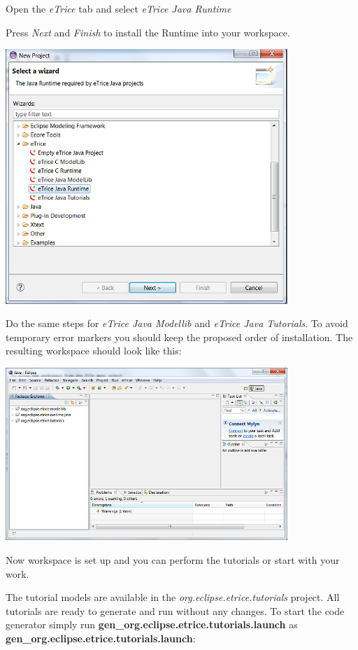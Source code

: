 Open the \textit{eTrice} tab and select \textit{eTrice Java Runtime}

Press \textit{Next} and \textit{Finish} to install the Runtime into your workspace.

\includegraphics[width=0.8\textwidth]{images/013-SetupWorkspace03.png}

Do the same steps for \textit{eTrice Java Modellib} and \textit{eTrice Java Tutorials}. To avoid temporary 
error markers you should keep the proposed order of installation. The resulting workspace should look like 
this:

\includegraphics[width=0.8\textwidth]{images/013-SetupWorkspace04.png}

Now workspace is set up and you can perform the tutorials or start with your work.

The tutorial models are available in the \textit{org.eclipse.etrice.tutorials} project. All tutorials are 
ready to generate and run without any changes. To start the code generator simply run 
\textbf{gen\_org.eclipse.etrice.tutorials.launch} as \textbf{gen\_org.eclipse.etrice.tutorials.launch}: 

